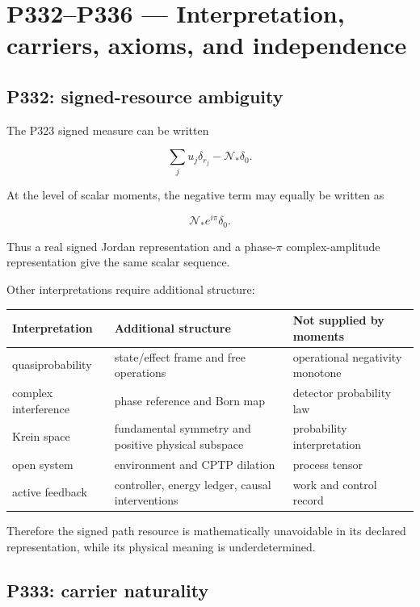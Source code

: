 \documentclass[11pt,a4paper,openany]{report}
\begin{document}
\chapter{P332--P336 --- Interpretation, carriers, axioms, and independence}

\section{P332: signed-resource ambiguity}

The P323 signed measure can be written

\[
\sum_j u_j\delta_{r_j}
-\mathcal N_*\delta_0.
\]

At the level of scalar moments, the negative term may equally be written as

\[
\mathcal N_*e^{i\pi}\delta_0.
\]

Thus a real signed Jordan representation and a phase-\(\pi\) complex-amplitude representation give the same scalar sequence.

Other interpretations require additional structure:

\begin{center}
\begingroup\small
\setlength{\tabcolsep}{2.5pt}
\renewcommand{\arraystretch}{1.16}
\begin{longtable}{@{}p{}p{}p{}@{}}
\toprule
\textbf{Interpretation} & \textbf{Additional structure} & \textbf{Not supplied by moments} \\
\midrule
\endhead
quasiprobability & state/\allowbreak{}effect frame and free operations & operational negativity monotone \\
complex interference & phase reference and Born map & detector probability law \\
Krein space & fundamental symmetry and positive physical subspace & probability interpretation \\
open system & environment and CPTP dilation & process tensor \\
active feedback & controller, energy ledger, causal interventions & work and control record \\
\bottomrule
\end{longtable}
\endgroup
\end{center}

Therefore the signed path resource is mathematically unavoidable in its declared representation, while its physical meaning is underdetermined.

\section{P333: carrier naturality}
\end{document}
